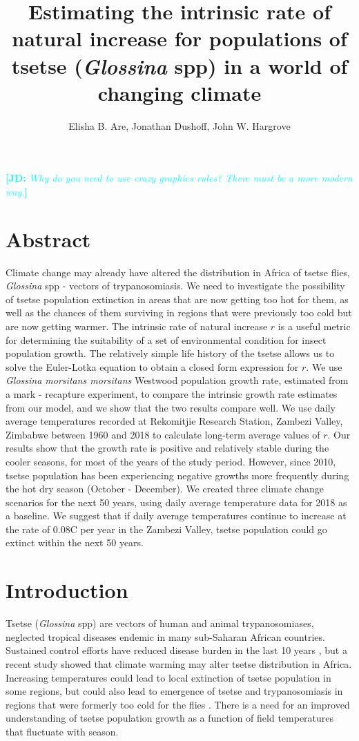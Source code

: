\documentclass[12pt,a4paper]{article}
\author{Elisha B. Are, Jonathan Dushoff, John W. Hargrove}
\title{Estimating the intrinsic rate of natural increase for  populations of tsetse (\textit{Glossina} spp) in a world of changing climate}
\newcommand{\comment}[3]{\textcolor{#1}{\textbf{[#2: }\textsl{#3}\textbf{]}}}
\newcommand{\jd}[1]{\comment{cyan}{JD}{#1}}
\begin{document}
\maketitle

\jd{Why do you need to use crazy graphics rules? There must be a more modern way.}

\section*{Abstract} 
Climate change may already have altered the distribution in Africa of tsetse flies, \textit{Glossina} spp - vectors of trypanosomiasis. We need to investigate the possibility of tsetse population extinction in areas that are now getting too hot for them, as well as the chances of them surviving in regions that were previously too cold but are now getting warmer. The intrinsic rate of natural increase $r$ is a useful metric for determining the suitability of a set of environmental condition for insect population growth.  The relatively simple life history of the tsetse allows us to solve the Euler-Lotka equation to obtain a closed form expression for  $r$. We use  \textit{Glossina morsitans morsitans} Westwood population growth rate, estimated from a mark - recapture experiment, to compare the intrinsic growth rate estimates from our model, and we show that the two results compare well. We use daily average temperatures recorded at Rekomitjie Research Station, Zambezi Valley, Zimbabwe between 1960 and 2018 to calculate long-term average values of  $r$. Our results show that the growth rate is positive and relatively stable during the cooler seasons, for most of the years of the study period. However, since 2010, tsetse population has been experiencing negative growths more frequently during the hot dry season (October - December).  We created three climate change scenarios for the next 50 years, using daily average temperature data for 2018 as a baseline. We suggest that if daily average temperatures continue to increase at the rate of 0.08\textdegree C per year in the Zambezi Valley, tsetse population could go extinct within the next 50 years.  

\section*{Introduction} 

Tsetse (\textit{Glossina} spp) are vectors of human and animal trypanosomiases, neglected tropical diseases endemic in many sub-Saharan African countries. Sustained control efforts have reduced disease burden in the last 10 years \cite{WorldHealthOrganizationWHO2018}, but a recent study showed that climate warming may alter tsetse distribution in Africa. Increasing temperatures could lead to local extinction of tsetse population in some regions, but could also lead to emergence of tsetse and trypanosomiasis in regions that were formerly too cold for the flies \cite{Lord2018}. There is a need for an improved understanding of tsetse population growth as a function of field temperatures that fluctuate with season. 
\end{document}
